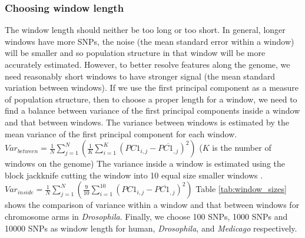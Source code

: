 \documentclass[11pt, oneside]{article}   	%
\begin{document}
\subsubsection{Choosing window length}
The window length should neither be too long or too short. 
In general, longer windows have more SNPs, 
the noise (the mean standard error within a window) will be smaller
and so population structure in that window will be more accurately estimated.
However, to better resolve features along the genome, we need reasonably short windows 
to have stronger signal (the mean standard variation between windows).
If we use the first principal component as a measure of population structure, 
then to choose a proper length for a window, 
we need to find a balance between variance of the first principal components inside a window and that between windows. 
The variance between windows is estimated by the mean variance of the first principal component for each window. 
$Var_{between}= \frac{1}{N}\sum_{j=1}^{N}\left ( \frac{1}{K}\sum_{i=1}^{K}\left ( PC1_{i,j} -\overline{PC1_{,j}} \right )^{2} \right )$ ($K$ is the number of windows on the genome)
The variance inside a window is estimated using the block jackknife cutting the window into 10 equal size smaller windows \citep{efron1982jackknife}. 
$Var_{inside}= \frac{1}{N}\sum_{j=1}^{N}\left ( \frac{9}{10}\sum_{i=1}^{10}\left ( PC1_{i,j} -\overline{PC1_{,j}} \right )^{2} \right )$
Table \ref{tab:window_sizes} shows the comparison of variance within a window and that between windows for chromosome arms in \textit{Drosophila}. Finally, we choose 100 SNPs, 1000 SNPs and 10000 SNPs as window length for human, \textit{Drosophila}, and \textit{Medicago} respectively.
\end{document}

